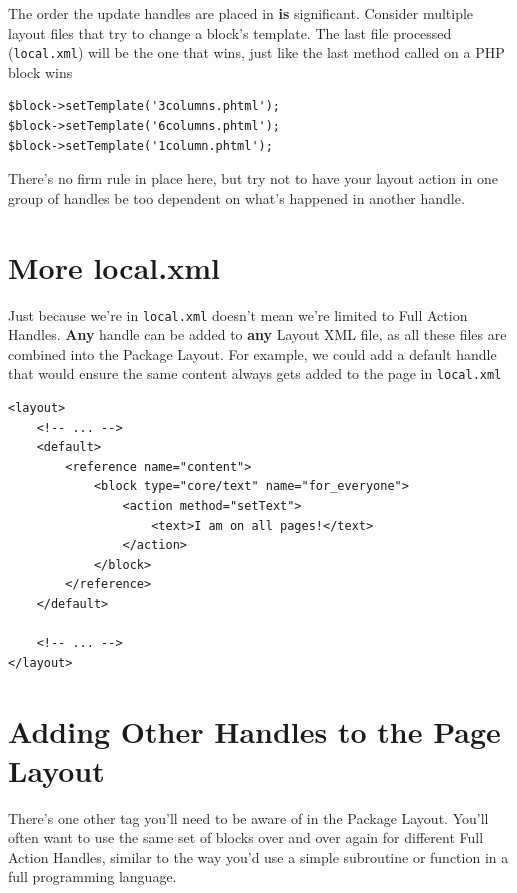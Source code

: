 \documentclass[oneside]{book}
\begin{document}
The order the update handles are placed in \textbf{is} significant. Consider multiple layout files that try to change a block's template.  The last file processed (\footnotesize\texttt{local.xml}\normalsize) will be the one that wins, just like the last method called on a PHP block wins

\begin{lstlisting}
$block->setTemplate('3columns.phtml');
$block->setTemplate('6columns.phtml');
$block->setTemplate('1column.phtml');  

\end{lstlisting}


There's no firm rule in place here, but try not to have your layout action in one group of handles be too dependent on what's happened in another handle.  

\section{More local.xml}

Just because we're in \footnotesize\texttt{local.xml} \normalsize  doesn't mean we're limited to Full Action Handles.  \textbf{Any} handle can be added to \textbf{any} Layout XML file, as all these files are combined into the Package Layout.  For example, we could add a default handle that would ensure the same content always gets added to the page in \footnotesize\texttt{local.xml} \normalsize 

\begin{lstlisting}
<layout>
    <!-- ... -->
    <default>
        <reference name="content">
            <block type="core/text" name="for_everyone">
                <action method="setText">
                    <text>I am on all pages!</text>
                </action>
            </block>                        
        </reference>        
    </default>

    <!-- ... -->
</layout>

\end{lstlisting}


\section{Adding Other Handles to the Page Layout}

There's one other tag you'll need to be aware of in the Package Layout.  You'll  often  want to use the same set of blocks over and over again for different Full Action Handles, similar to the way you'd use a simple subroutine or function in a full programming language.  
\end{document}
